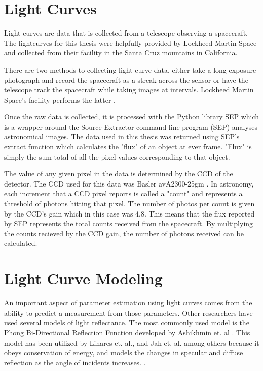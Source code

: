 \section{Light Curves}

Light curves are data that is collected from a telescope observing a spacecraft. The lightcurves for this thesis were helpfully provided by Lockheed Martin Space and collected from their facility in the Santa Cruz mountains in California.

There are two methods to collecting light curve data, either take a long exposure photograph and record the spacecraft as a streak across the sensor or have the telescope track the spacecraft while taking images at intervals. Lockheed Martin Space's facility performs the latter \cite{lockheed_telescope}. 

Once the raw data is collected, it is processed with the Python library SEP which is a wrapper around the Source Extractor command-line program (SEP) analyses astronomical images. The data used in this thesis was returned using SEP's extract function which calculates the "flux" of an object at ever frame. "Flux" is simply the sum total of all the pixel values corresponding to that object.

The value of any given pixel in the data is determined by the CCD of the detector. The CCD used for this data was Basler avA2300-25gm \cite{baseler_ccd}. In astronomy, each increment that a CCD pixel reports is called a "count" and represents a threshold of photons hitting that pixel. The number of photos per count is given by the CCD's gain which in this case was 4.8. This means that the flux reported by SEP represents the total counts received from the spacecraft. By multiplying the counts recieved by the CCD gain, the number of photons received can be calculated.

\section{Light Curve Modeling}

An important aspect of parameter estimation using light curves comes from the ability to predict a measurement from those parameters. Other researchers have used several models of light reflectance. The most commonly used model is the Phong Bi-Directional Reflection Function developed by Ashikhmin et. al \cite{phong_brdf}. This model has been utilized by Linares et. al., and Jah et. al. among others because it obeys conservation of energy, and models the changes in specular and diffuse reflection as the angle of incidents increases. \cite{SpaceObjectCharacterization} \cite{StateAndParameter} \cite{Linares_data_fusion}.

